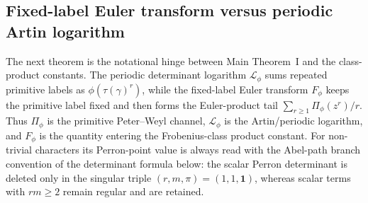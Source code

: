 \documentclass[11pt,a4paper]{amsart}
\theoremstyle{plain}
\theoremstyle{definition}
\theoremstyle{remark}
\begin{document}
\subsection{Fixed-label Euler transform versus periodic Artin logarithm}
\label{subsec:fixed-label-vs-artin-logarithm}

The next theorem is the notational hinge between Main Theorem~I and the
class-product constants.  The periodic determinant logarithm
\(\mathcal L_\phi\) sums repeated primitive labels as
\(\phi(\tau(\gamma)^r)\), while the fixed-label Euler transform
\(F_\phi\) keeps the primitive label fixed and then forms the Euler-product
tail \(\sum_{r\ge1}\Pi_\phi(z^r)/r\).  Thus \(\Pi_\phi\) is the primitive
Peter--Weyl channel, \(\mathcal L_\phi\) is the Artin/periodic logarithm,
and \(F_\phi\) is the quantity entering the Frobenius-class product
constant.  For non-trivial characters its Perron-point value is always read
with the Abel-path branch convention of the determinant formula below: the
scalar Perron determinant is deleted only in the singular triple
\((r,m,\pi)=(1,1,\mathbf1)\), whereas scalar terms with \(rm\ge2\) remain
regular and are retained.
\end{document}
